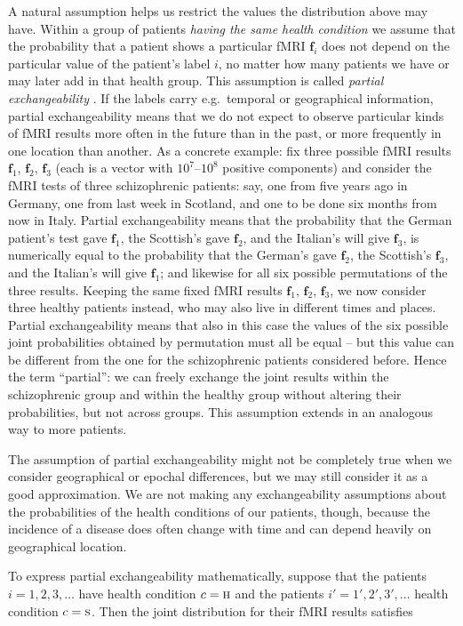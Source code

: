 \documentclass[%
]{frontiersSCNS-nologo} %
\newcommand*{\eg}{e.g.}
\renewcommand*{\|}{\mathpunct{|}}%
\newcommand*{\yh}{c}
\newcommand*{\yhu}{\textsc{h}}
\newcommand*{\yhd}{\textsc{s}}
\newcommand*{\yf}{\bm{f}}
\begin{document}
A natural assumption helps us restrict the values the distribution above
may have. Within a group of patients \emph{having the same health
  condition} we assume that the probability that a patient shows a
particular fMRI $\yf_i$ does not depend on the particular value of the
patient's label $i$, no matter how many patients we have or may later add
in that health group. This assumption is called \emph{partial
  exchangeability}
\citep{definetti1938,diaconisetal1981,aldous1985,diaconis1988}. If the
labels carry \eg\ temporal or geographical information, partial
exchangeability means that we do not expect to observe particular kinds of
fMRI results more often in the future than in the past, or more frequently
in one location than another. As a concrete example: fix three possible
fMRI results $\yf_1$, $\yf_2$, $\yf_3$ (each is a vector with
$10^7$--$10^8$ positive components) and consider the fMRI tests of three
schizophrenic patients: say, one from five years ago in Germany, one from
last week in Scotland, and one to be done six months from now in Italy.
Partial exchangeability means that the probability that the German
patient's test gave $\yf_1$, the Scottish's gave $\yf_2$, and the Italian's
will give $\yf_3$, is numerically equal to the probability that the
German's gave $\yf_2$, the Scottish's $\yf_3$, and the Italian's will give
$\yf_1$; and likewise for all six possible permutations of the three
results. Keeping the same fixed fMRI results $\yf_1$, $\yf_2$, $\yf_3$, we
now consider three healthy patients instead, who may also live in different
times and places. Partial exchangeability means that also in this case the
values of the six possible joint probabilities obtained by permutation must
all be equal -- but this value can be different from the one for the
schizophrenic patients considered before. Hence the term \enquote{partial}: we
can freely exchange the joint results within the schizophrenic group and
within the healthy group without altering their probabilities, but not
across groups. This assumption extends in an analogous way to more
patients.

The assumption of partial exchangeability might not be completely true when
we consider geographical or epochal differences, but we may still consider
it as a good approximation. We are not making any exchangeability
assumptions about the probabilities of the health conditions of our
patients, though, because the incidence of a disease does often change with
time and can depend heavily on geographical location.

To express partial exchangeability mathematically, suppose that the
patients $i = 1,2,3,\dotsc$ have health condition $\yh=\yhu$ and the patients
$i' = 1',2',3',\dotsc$ health condition $\yh=\yhd$. Then the joint distribution for
their fMRI results satisfies 
\end{document}
